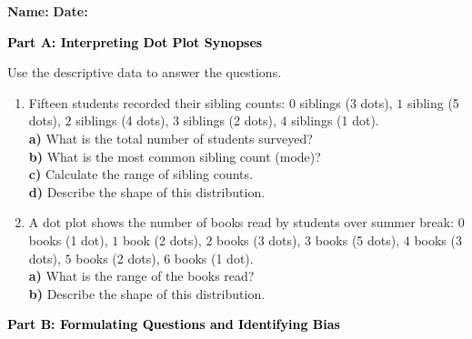 \documentclass[12pt, letterpaper, fleqn]{article}
\newcommand{\blank}{\underline{\hspace{2.2cm}}}
\newcommand{\blanklong}{\underline{\hspace{6.5cm}}}
\begin{document}
\textbf{Name:} \underline{\hspace{5cm}}
\hfill
\textbf{Date:} \underline{\hspace{3cm}}\\

\begin{tcolorbox}[colback=black!10]
    \large\textcolor{black}{\textbf{Part A: Interpreting Dot Plot Synopses}}
\end{tcolorbox}

\vspace{3mm}

\noindent
Use the descriptive data to answer the questions.

\vspace{5mm}

\begin{enumerate}[itemsep=2.0cm, leftmargin=0.6cm]
\item Fifteen students recorded their sibling counts: $0$ siblings (3 dots), $1$ sibling (5 dots), $2$ siblings (4 dots), $3$ siblings (2 dots), $4$ siblings (1 dot). \\
\textbf{a)} What is the total number of students surveyed? \blank \\
\textbf{b)} What is the most common sibling count (mode)? \blank \\
\textbf{c)} Calculate the range of sibling counts. \blank \\
\textbf{d)} Describe the shape of this distribution. \blanklong

\item A dot plot shows the number of books read by students over summer break: $0$ books (1 dot), $1$ book (2 dots), $2$ books (3 dots), $3$ books (5 dots), $4$ books (3 dots), $5$ books (2 dots), $6$ books (1 dot). \\
\textbf{a)} What is the range of the books read? \blank \\
\textbf{b) }Describe the shape of this distribution. \blanklong
\end{enumerate}

\newpage

\begin{tcolorbox}[colback=black!10]
    \large\textcolor{black}{\textbf{Part B: Formulating Questions and Identifying Bias}}
\end{tcolorbox}
\end{document}

